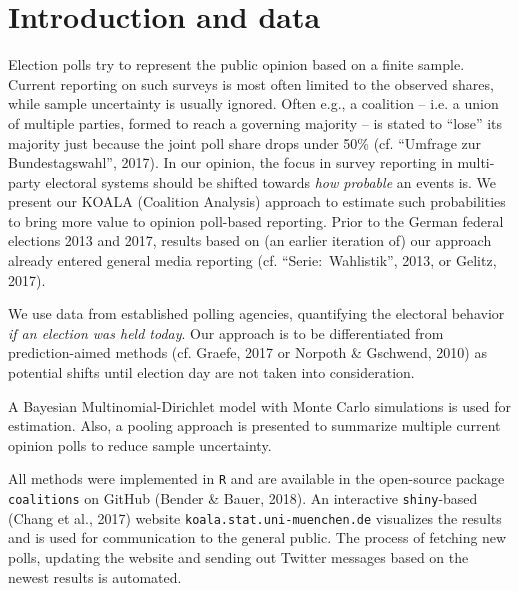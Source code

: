 \documentclass[twoside]{report}
\begin{document}


\section{Introduction and data}
Election polls
try to represent the public opinion based on a finite sample. Current reporting on such surveys is most often limited to the observed shares, while sample uncertainty
is usually ignored. Often e.g., a coalition -- i.e. a union of multiple parties, formed to reach a governing majority -- is stated to ``lose'' its majority just because the joint poll share drops under 50\% (cf. ``Umfrage zur Bundestagswahl'', 2017).
In our opinion, the focus in survey reporting in multi-party electoral systems should be shifted towards
\textit{how probable} an events is. 
We present our KOALA (Coalition Analysis) approach to estimate such probabilities
to bring more value to opinion poll-based reporting.
Prior to the German federal elections 2013 and 2017, results based on (an earlier iteration of) our approach already entered general media reporting (cf. ``Serie:~Wahlistik'', 2013, or Gelitz, 2017).

We use data from
established polling agencies,
quantifying the electoral behavior \textit{if an election was held today}.
Our approach is to be differentiated from prediction-aimed methods (cf. Graefe, 2017 or Norpoth \& Gschwend, 2010) as potential shifts until election day are not taken into consideration.

A Bayesian Multinomial-Dirichlet model with Monte Carlo simulations is used for estimation. Also, a pooling approach is presented to summarize multiple current opinion polls to reduce sample uncertainty.

All methods were implemented in \texttt{R} and are available in the open-source
package \texttt{coalitions} on GitHub (Bender \& Bauer, 2018). An
interactive \texttt{shiny}-based (Chang et al., 2017) website \texttt{koala.stat.uni-\allowbreak muenchen.\allowbreak de}
visualizes the results and is used for communication to the general public.
The process of fetching new polls, updating the website and sending out Twitter messages based on the newest results is automated.
\end{document}

